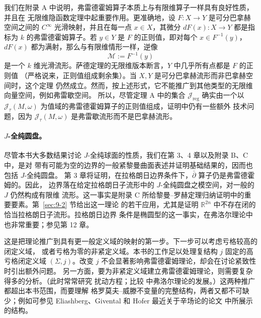 我们在附录 A 中说明，弗雷德霍姆算子本质上与有限维算子一样具有良好性质，并且在
无限维隐函数定理中起重要作用。更准确地，设 $F:X\to Y$ 是可分巴拿赫空间之间的
$C^\infty$ 光滑映射，并且在每一点 $x\in X$，其微分 $dF(x):X\to Y$ 都是指标为
$k$ 的弗雷德霍姆算子。若 $y\in Y$ 是 $F$ 的正则值，即对每个 $x\in F^{-1}(y)$，
$dF(x)$ 都为满射，那么与有限维情形一样，逆像
\[
  \mathcal M:=F^{-1}(y)
\]
是一个 $k$ 维光滑流形。萨德定理的无限维版本断言，$Y$ 中几乎所有点都是 $F$ 的正则值
（严格说来，正则值组成剩余集）。当 $X,Y$ 是可分巴拿赫流形而非巴拿赫空间时，这个定理
仍然成立。然而，按上述形式，它不能推广到其他类型的无限维向量空间，例如弗雷歇空间。
所以，尽管定理 A 中的集合 $\mathcal J_{\mathrm{reg}}$ 确实由一个以
$\mathcal J_\tau(M,\omega)$ 为值域的弗雷德霍姆算子的正则值组成，证明中仍有一些额外
技术问题，因为 $\mathcal J_\tau(M,\omega)$ 是弗雷歇流形而不是巴拿赫流形。

\paragraph{$J$-全纯圆盘。}
尽管本书大多数结果讨论 $J$-全纯球面的性质，我们在第 3、4 章以及附录 B、C 中，是对
带有可能为空的边界的一般紧黎曼曲面表述并证明基础结果的，因而也包括 $J$-全纯圆盘。
第 3 章将证明，在拉格朗日边界条件下，$\bar\partial$ 算子仍是弗雷德霍姆的。因此，
边界落在给定拉格朗日子流形中的 $J$-全纯圆盘之模空间，对一般的 $J$ 仍然构成有限维
流形。这一事实是附录 C 所给黎曼--罗赫定理归纳证明中的重要要素。第~\ref{sec:9-2} 节给出这一理论
的若干应用，尤其是证明 $\mathbb R^{2n}$ 中不存在闭的恰当拉格朗日子流形。拉格朗日边界
条件是椭圆型的这一事实，在弗洛尔理论中也非常重要；参见第 12 章。

这是把理论推广到具有更一般定义域的映射的第一步。下一步可以考虑亏格较高的闭定义域，
或者亏格为零的非紧定义域。本书的工作足以处理复结构 $j$ 固定的高亏格闭定义域
$(\Sigma,j)$。改变 $j$ 不会显著影响弗雷德霍姆理论，却会在讨论紧致性时引出额外问题。
另一方面，要为非紧定义域建立弗雷德霍姆理论，则需要复杂得多的分析。（此时常常研究
扰动方程；比较  中弗洛尔理论的发展。）这两种推广都超出本书范围，而要理解
格罗莫夫--威滕不变量的完整结构，两者又都不可缺少；例如可参见 Eliashberg、Givental 和
Hofer 最近关于辛场论的论文  中所展示的结构。

